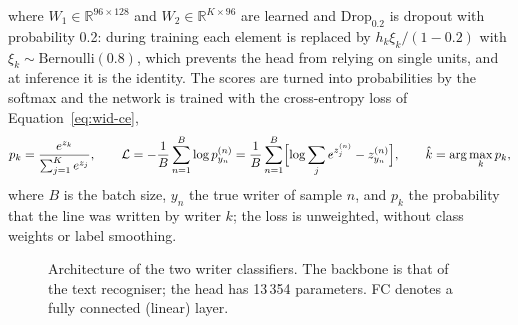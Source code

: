 where $W_1\in\mathbb R^{96\times128}$ and $W_2\in\mathbb R^{K\times96}$ are learned and $\mathrm{Drop}_{0.2}$ is dropout \cite{srivastava2014} with probability 0.2: during training each element is replaced by $h_k\xi_k/(1-0.2)$ with $\xi_k\sim\mathrm{Bernoulli}(0.8)$, which prevents the head from relying on single units, and at inference it is the identity.
The scores are turned into probabilities by the softmax and the network is trained with the cross-entropy loss of Equation~\ref{eq:wid-ce},
\begin{equation}
p_k=\frac{e^{z_k}}{\sum_{j=1}^{K}e^{z_j}},\qquad
\mathcal L=-\frac1B\sum_{n=1}^{B}\log p^{(n)}_{y_n}=\frac1B\sum_{n=1}^B\Bigl[\log\sum_je^{z^{(n)}_j}-z^{(n)}_{y_n}\Bigr],\qquad\hat k=\arg\max_kp_k,
\label{eq:wid-ce}
\end{equation}
where $B$ is the batch size, $y_n$ the true writer of sample $n$, and $p_k$ the probability that the line was written by writer $k$; the loss is unweighted, without class weights or label smoothing.

\begin{figure}[h]
\centering
{}
\caption{Architecture of the two writer classifiers. The backbone is that of the text recogniser; the head has 13\,354 parameters. FC denotes a fully connected (linear) layer.}
\label{fig:wid-arch}
\end{figure}


